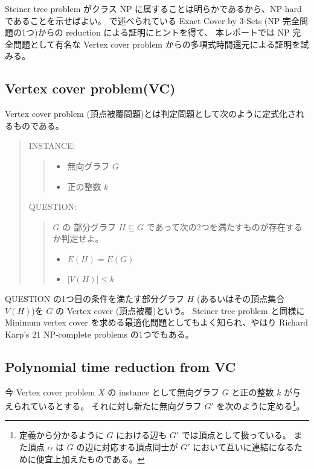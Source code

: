 \documentclass[12pt,uplatex,dvipdfmx,titlepage]{article}
\theoremstyle{case}
\begin{document}
    Steiner tree problem がクラス NP に属することは明らかであるから、NP-hard であることを示せばよい。
    \cite{prf}で述べられている Exact Cover by 3-Sets (NP 完全問題の1つ)からの reduction による証明にヒントを得て、
    本レポートでは NP 完全問題として有名な Vertex cover problem からの多項式時間還元による証明を試みる。

    \subsection{Vertex cover problem(VC)}
    Vertex cover problem (頂点被覆問題)とは判定問題として次のように定式化されるものである。
    \begin{quote}
        INSTANCE:
        \begin{quote}
            \begin{itemize}
                \item 無向グラフ $G$
                \item 正の整数 $k$
            \end{itemize}
        \end{quote}

        QUESTION:
        \begin{quote}
            $G$ の 部分グラフ $H\subseteq G$ であって次の2つを満たすものが存在するか判定せよ。
            \begin{itemize}
                \item $E(H) = E(G)$
                \item $|V(H)|\le k$
            \end{itemize}
        \end{quote}
    \end{quote}
    QUESTION の1つ目の条件を満たす部分グラフ $H$ (あるいはその頂点集合 $V(H)$)を $G$ の Vertex cover (頂点被覆)という。
    Steiner tree problem と同様に Minimum vertex cover を求める最適化問題としてもよく知られ、やはり Richard Karp's 21 NP-complete problems\cite{karp} の1つでもある。

    \subsection{Polynomial time reduction from VC}
    今 Vertex cover problem $X$ の instance として無向グラフ $G$ と正の整数 $k$ が与えられているとする。
    それに対し新たに無向グラフ $G'$ を次のように定める\footnote{定義から分かるように $G$ における辺も $G'$ では頂点として扱っている。
    また頂点 $\alpha$ は $G$ の辺に対応する頂点同士が $G'$ において互いに連結になるために便宜上加えたものである。}。
\end{document}

